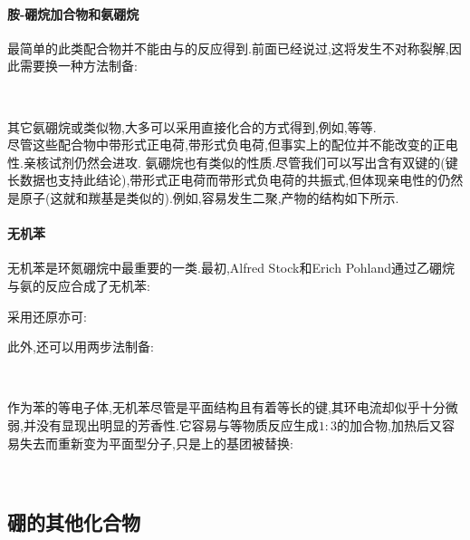 \documentclass{ctexart}
\begin{document}
\paragraph{胺-硼烷加合物和氨硼烷}
最简单的此类配合物并不能由与的反应得到.前面已经说过,这将发生不对称裂解,因此需要换一种方法制备:
\begin{center}
    \\
\end{center}
其它氨硼烷或类似物,大多可以采用直接化合的方式得到,例如,等等.\\
\indent 尽管这些配合物中带形式正电荷,带形式负电荷,但事实上的配位并不能改变的正电性.亲核试剂仍然会进攻.
\indent 氨硼烷也有类似的性质.尽管我们可以写出含有双键的(键长数据也支持此结论),带形式正电荷而带形式负电荷的共振式,但体现亲电性的仍然是原子(这就和羰基是类似的).例如,容易发生二聚,产物的结构如下所示.
\paragraph{无机苯}
无机苯是环氮硼烷中最重要的一类.最初,Alfred Stock和Erich Pohland通过乙硼烷与氨的反应合成了无机苯:
\begin{center}
\end{center}
采用还原亦可:
\begin{center}
\end{center}
此外,还可以用两步法制备:
\begin{center}
    \\
\end{center}
作为苯的等电子体,无机苯尽管是平面结构且有着等长的键,其环电流却似乎十分微弱,并没有显现出明显的芳香性.它容易与等物质反应生成$1:3$的加合物,加热后又容易失去而重新变为平面型分子,只是上的基团被替换:
\begin{center}
    \\
\end{center}
\subsection{硼的其他化合物}
\end{document}
